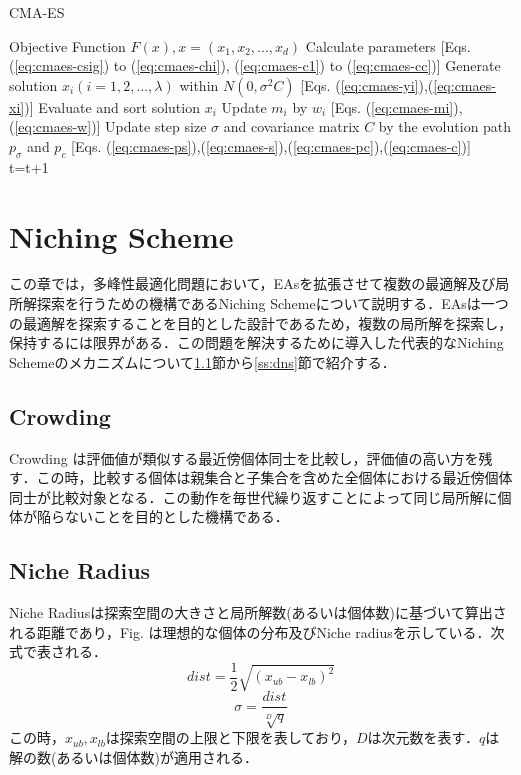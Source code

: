 \documentclass[a4j,11pt]{jarticle}
\begin{document}
\begin{algorithm}[H]
\caption{CMA-ES}
\label{code:cma-es}
\begin{algorithmic}[5]
\REQUIRE Objective Function $F(x), x=(x_1,x_2,...,x_d)$
\STATE Calculate parameters [Eqs. (\ref{eq:cmaes-csig}) to (\ref{eq:cmaes-chi}), (\ref{eq:cmaes-c1}) to (\ref{eq:cmaes-cc})]
\STATE Generate solution $x_i (i=1,2,...,\lambda)$ within $N(0, \sigma^2 C)$ [Eqs. (\ref{eq:cmaes-yi}),(\ref{eq:cmaes-xi})]
\ENDFOR
\STATE Evaluate and sort solution $x_i$
\STATE Update $m_i$ by $w_i$ [Eqs. (\ref{eq:cmaes-mi}),(\ref{eq:cmaes-w})]
\STATE Update step size $\sigma$ and covariance matrix $C$ by the evolution path $p_{\sigma}$ and $p_c$ [Eqs. (\ref{eq:cmaes-ps}),(\ref{eq:cmaes-s}),(\ref{eq:cmaes-pc}),(\ref{eq:cmaes-c})]
\ENDFOR
\STATE t=t+1
\ENDWHILE
\end{algorithmic}
\end{algorithm}

\newpage
\section{Niching Scheme}
\label{sec:ns}
この章では，多峰性最適化問題において，EAsを拡張させて複数の最適解及び局所解探索を行うための機構であるNiching Schemeについて説明する．EAsは一つの最適解を探索することを目的とした設計であるため，複数の局所解を探索し，保持するには限界がある．この問題を解決するために導入した代表的なNiching Schemeのメカニズムについて\ref{ss:Crowding}節から\ref{ss:dns}節で紹介する．

\subsection{Crowding}
\label{ss:Crowding}
Crowding \cite{Crowding} は評価値が類似する最近傍個体同士を比較し，評価値の高い方を残す．この時，比較する個体は親集合と子集合を含めた全個体における最近傍個体同士が比較対象となる．この動作を毎世代繰り返すことによって同じ局所解に個体が陥らないことを目的とした機構である．

\subsection{Niche Radius}
\label{ss:nr}
Niche Radiusは探索空間の大きさと局所解数(あるいは個体数)に基づいて算出される距離であり，Fig. は理想的な個体の分布及びNiche radiusを示している．次式で表される．
\begin{equation}
\label{eq:nr-d}
dist=\frac{1}{2}\sqrt{(x_{ub}-x_{lb})^2}
\end{equation}
\begin{equation}
\label{eq:nr-s}
\sigma=\frac{dist}{\sqrt[D]{q}}
\end{equation}
この時，$x_{ub},x_{lb}$は探索空間の上限と下限を表しており，$D$は次元数を表す．$q$は解の数(あるいは個体数)が適用される．
\end{document}
